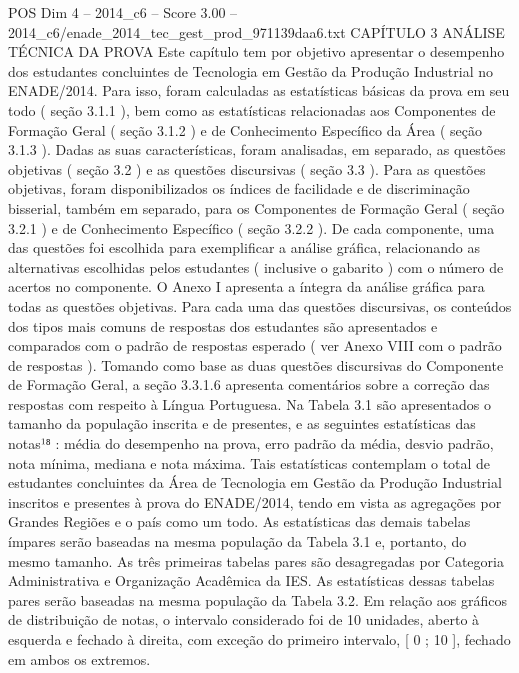 \begin{textsample}{POS Dim 4 – 2014\_c6 – Score 3.00 – 2014\_c6/enade\_2014\_tec\_gest\_prod\_971139daa6.txt}  \label{ex:f4_pos_076}
CAPÍTULO 3 ANÁLISE TÉCNICA DA PROVA Este capítulo tem por objetivo apresentar o desempenho dos estudantes concluintes de Tecnologia em Gestão da Produção Industrial no ENADE/2014.
Para isso, foram calculadas as estatísticas básicas da prova em seu todo ( seção 3.1.1 ), bem como as estatísticas relacionadas aos Componentes de Formação Geral ( seção 3.1.2 ) e de Conhecimento Específico da Área ( seção 3.1.3 ).
Dadas as suas características, foram analisadas, em separado, as questões objetivas ( seção 3.2 ) e as questões discursivas ( seção 3.3 ).
Para as questões objetivas, foram disponibilizados os índices de facilidade e de discriminação bisserial, também em separado, para os Componentes de Formação Geral ( seção 3.2.1 ) e de Conhecimento Específico ( seção 3.2.2 ).
De cada componente, uma das questões foi escolhida para exemplificar a análise gráfica, relacionando as alternativas escolhidas pelos estudantes ( inclusive o gabarito ) com o número de acertos no componente.
O Anexo I apresenta a íntegra da análise gráfica para todas as questões objetivas.
Para cada uma das questões discursivas, os conteúdos dos tipos mais comuns de respostas dos estudantes são apresentados e comparados com o padrão de respostas esperado ( ver Anexo VIII com o padrão de respostas ).
Tomando como base as duas questões discursivas do Componente de Formação Geral, a seção 3.3.1.6 apresenta comentários sobre a correção das respostas com respeito à Língua Portuguesa.
Na Tabela 3.1 são apresentados o tamanho da população inscrita e de presentes, e as seguintes estatísticas das notas¹⁸ : média do desempenho na prova, erro padrão da média, desvio padrão, nota mínima, mediana e nota máxima.
Tais estatísticas contemplam o total de estudantes concluintes da Área de Tecnologia em Gestão da Produção Industrial inscritos e presentes à prova do ENADE/2014, tendo em vista as agregações por Grandes Regiões e o país como um todo.
As estatísticas das demais tabelas ímpares serão baseadas na mesma população da Tabela 3.1 e, portanto, do mesmo tamanho.
As três primeiras tabelas pares são desagregadas por Categoria Administrativa e Organização Acadêmica da IES.
As estatísticas dessas tabelas pares serão baseadas na mesma população da Tabela 3.2.
Em relação aos gráficos de distribuição de notas, o intervalo considerado foi de 10 unidades, aberto à esquerda e fechado à direita, com exceção do primeiro intervalo, [ 0 ; 10 ], fechado em ambos os extremos.

\end{textsample}
